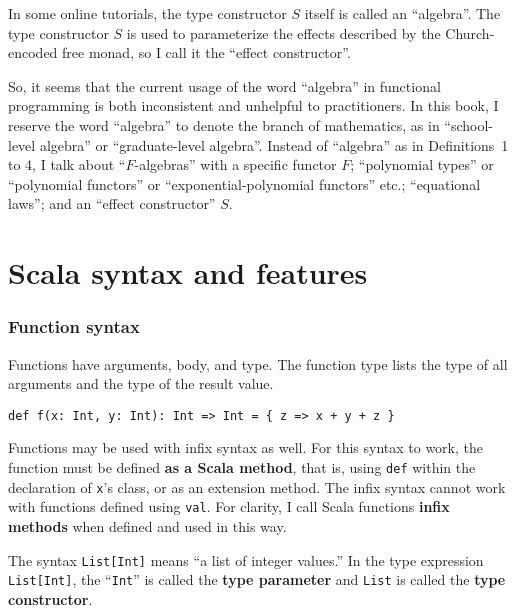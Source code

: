 In some online tutorials, the type constructor $S$ itself is called
an ``algebra''. The type constructor $S$ is used to parameterize
the effects described by the Church-encoded free monad, so I call
it the ``effect constructor''.

So, it seems that the current usage of the word ``algebra'' in functional
programming is both inconsistent and unhelpful to practitioners. In
this book, I reserve the word ``algebra'' to denote the branch of
mathematics, as in ``school-level algebra'' or ``graduate-level
algebra''. Instead of ``algebra'' as in Definitions~1 to 4, I
talk about ``$F$-algebras'' with a specific functor $F$; ``polynomial
types'' or ``polynomial functors'' or ``exponential-polynomial
functors'' etc.; ``equational laws''; and an ``effect constructor''
$S$.

\chapter{Scala syntax and features}

\subsection{Function syntax}

Functions have arguments, body, and type. The function type lists
the type of all arguments and the type of the result value.
\begin{lstlisting}
def f(x: Int, y: Int): Int => Int = { z => x + y + z }
\end{lstlisting}
Functions may be used with infix syntax as well.
For this syntax to work, the function must be defined \textbf{as a
Scala method}, that is, using
\texttt{def} within the declaration of \texttt{x}'s class, or as an
extension method. The infix syntax cannot work with functions defined
using \texttt{val}. For clarity, I call Scala functions \textbf{infix
methods} when defined and used in this way.

The syntax \texttt{}\lstinline!List[Int]!
means ``a list of integer values.'' In the type expression \lstinline!List[Int]!,
the ``\texttt{}\lstinline!Int!''
is called the \textbf{type parameter} and \texttt{}\lstinline!List!
is called the \textbf{type constructor}. 

